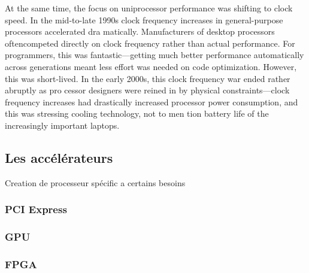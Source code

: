 At the same time, the focus on uniprocessor performance was shifting to clock speed. In the mid-to-late 1990s clock frequency increases in general-purpose processors accelerated dra matically. Manufacturers of desktop processors oftencompeted directly on clock frequency rather than actual performance. For programmers, this was fantastic—getting much better performance automatically across generations meant less effort was needed on code optimization. However, this was short-lived. In the early 2000s, this clock frequency war ended rather abruptly as pro cessor designers were reined in by physical constraints—clock frequency increases had drastically increased processor power consumption, and this was stressing cooling technology, not to men tion battery life of the increasingly important laptops.

\subsection{Les accélérateurs}
Creation de processeur spécific a certains besoins

\subsubsection{PCI Express}

\subsubsection{GPU}

\subsubsection{FPGA}




